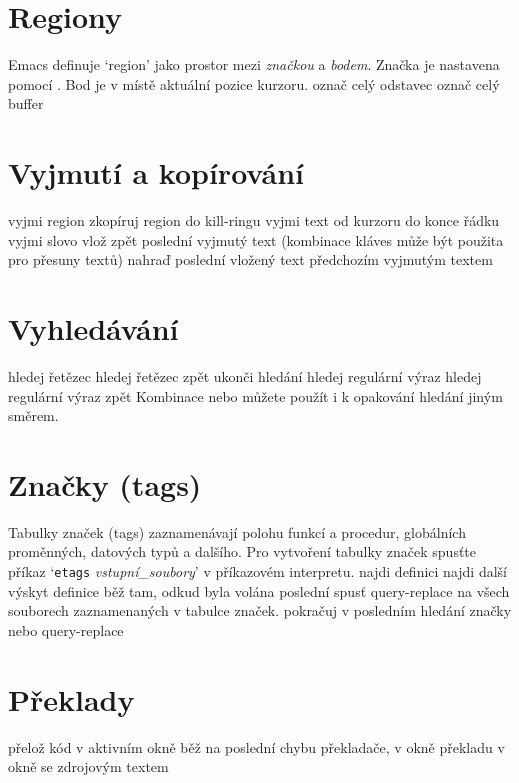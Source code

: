 \section{Regiony}

Emacs definuje `region' jako prostor mezi {\it značkou\/} a
{\it bodem}. Značka je nastavena pomocí .
Bod je v místě aktuální pozice kurzoru.
\askip
{} označ celý odstavec
 označ celý buffer

\section{Vyjmutí a kopírování}

 vyjmi region
 zkopíruj region do kill-ringu
 vyjmi text od kurzoru do konce řádku
 vyjmi slovo
 vlož zpět poslední vyjmutý text (kombinace kláves 
          může být použita pro přesuny textů)
 nahraď poslední vložený text předchozím vyjmutým textem

\section{Vyhledávání}

 hledej řetězec
 hledej řetězec zpět
 ukonči hledání
 hledej regulární výraz
 hledej regulární výraz zpět
\askip
Kombinace  nebo  můžete použít i k opakování hledání
jiným směrem.

\section{Značky (tags)}

Tabulky značek (tags) zaznamenávají polohu funkcí a procedur, globálních
proměnných, datových typů a dalšího. Pro vytvoření tabulky značek spusťte
příkaz `{\tt etags} {\it vstupní\_soubory}' v příkazovém interpretu.
\askip
{} najdi definici
 najdi další výskyt definice
 běž tam, odkud byla volána poslední 
 spusť query-replace na všech souborech
zaznamenaných v tabulce značek.
 pokračuj v posledním hledání značky nebo query-replace

\section{Překlady}

 přelož kód v aktivním okně
 běž na poslední chybu překladače, v okně překladu
 v okně se zdrojovým textem

